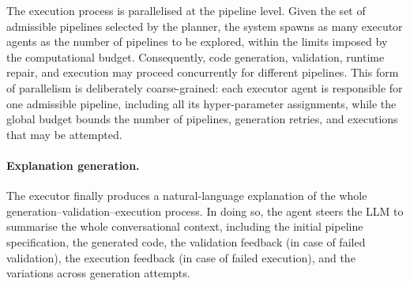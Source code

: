 \documentclass[runningheads]{llncs}
\begin{document}
The execution process is parallelised at the pipeline level.
%
Given the set of admissible pipelines selected by the planner,
the system spawns as many executor agents as the number of pipelines to be explored,
within the limits imposed by the computational budget.
%
Consequently,
code generation,
validation,
runtime repair,
and execution may proceed concurrently for different pipelines.
%
This form of parallelism is deliberately coarse-grained:
each executor agent is responsible for one admissible pipeline,
including all its hyper-parameter assignments,
while the global budget bounds the number of pipelines,
generation retries,
and executions that may be attempted.

\paragraph{Explanation generation.}


The executor finally produces a natural-language explanation
of the whole generation--validation--execution process.
%
In doing so,
the agent steers the \ac{LLM} to summarise the whole conversational context,
including the initial pipeline specification,
the generated code,
the validation feedback (in case of failed validation),
the execution feedback (in case of failed execution),
and the variations across generation attempts.

\end{document}
